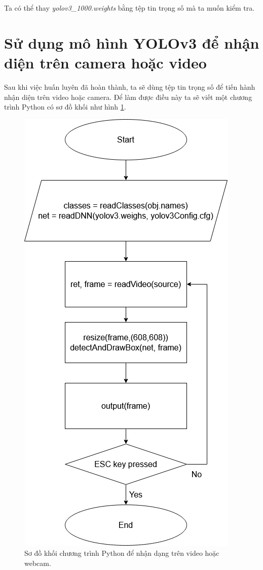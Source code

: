 \begin{enumerate}
\noindent{}

	Ta có thể thay \emph{yolov3{\_}1000.weights} bằng tệp tin trọng số mà ta muốn kiểm tra.
\end{enumerate}

\section{Sử dụng mô hình YOLOv3 để nhận diện trên camera hoặc video}

Sau khi việc huấn luyên đã hoàn thành, ta sẽ dùng tệp tin trọng số để tiến hành nhận diện trên video hoặc camera. Để làm được điều này ta sẽ viết một chương trình Python có sơ đồ khối như hình \ref{fig:flow_chart}.
\begin{figure}[ht!]
	\centerline{\includegraphics[scale=0.6]{images/flow_chart.png}}
  	\caption{Sơ đồ khối chương trình Python để nhận dạng trên video hoặc webcam.}
  	\label{fig:flow_chart}
\end{figure}

